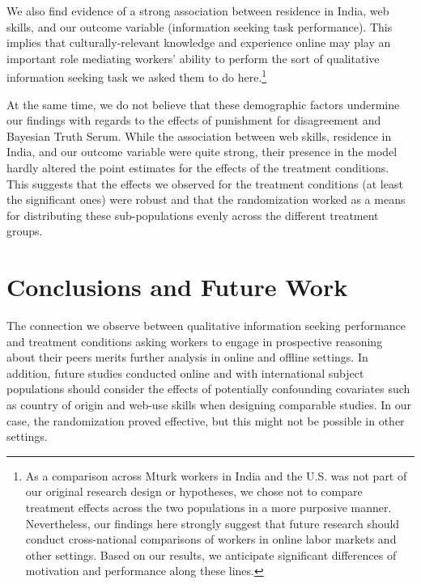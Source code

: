 \documentclass{chi2009}
\begin{document}
{We also find evidence of a strong association between residence in
India, web skills, and our outcome variable (information seeking task
performance). This implies that culturally-relevant knowledge and
experience online may play an important role mediating workers'
ability to perform the sort of qualitative information seeking task we
asked them to do here.\footnote{As a comparison across Mturk workers
  in India and the U.S. was not part of our original research design
  or hypotheses, we chose not to compare treatment effects across the
  two populations in a more purposive manner. Nevertheless, our
  findings here strongly suggest that future research should conduct
  cross-national comparisons of workers in online labor markets and
  other settings. Based on our results, we anticipate significant
  differences of motivation and performance along these
  lines.\cite{antin2011desirability}}

At the same time, we do not believe that these demographic factors
undermine our findings with regards to the effects of punishment for
disagreement and Bayesian Truth Serum. While the association between
web skills, residence in India, and our outcome variable were quite
strong, their presence in the model hardly altered the point estimates
for the effects of the treatment conditions. This suggests that the
effects we observed for the treatment conditions (at least the
significant ones) were robust and that the randomization worked as a
means for distributing these sub-populations evenly across the
different treatment groups.


\section{Conclusions and Future Work}

The connection we observe between qualitative information seeking
performance and treatment conditions asking workers to engage in
prospective reasoning about their peers merits further analysis in
online and offline settings. In addition, future studies conducted
online and with international subject populations should consider the
effects of potentially confounding covariates such as country of
origin and web-use skills when designing comparable studies. In our
case, the randomization proved effective, but this might not be
possible in other settings. 

}
\end{document}
